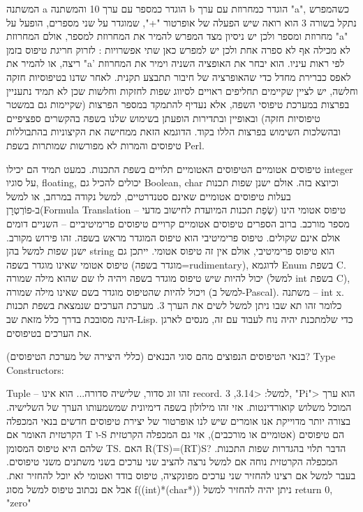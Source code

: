       המשתנה a הוגדר כמספר עם ערך 10 והמשתנה b הוגדר כמחרוזת עם ערך "a", כשהמפרש נתקל בשורה 3 הוא רואה שיש הפעלה של אופרטור "+", שמוגדר על שני מספרים, הופעל על מחרוזת ומספר ולכן יש ניסיון מצד המפרש להמיר את המחרוזת למספר, אולם המחרוזת "a" לא מכילה אף לא ספרה אחת ולכן יש למפרש כאן שתי אפשרויות : לזרוק חריגת טיפוס בזמן ריצה, או להמיר את "a' לפי ראות עיניו. הוא יבחר את האופציה השניה וימיר את המחרוזת לאפס כברירת מחדל כדי שהאופרציה של חיבור תתבצע תקנית.
      לאחר שדנו בטיפוסיות חזקה וחלשה, יש לציין שקיימים תחליפים ראויים לסיווג שפות לחזקות וחלשות שכן לא תמיד נתעניין בפרצות במערכת טיפוסי השפה, אלא נעדיף להתמקד במספר הפרצות (שקיימות גם במשטר טיפוסיות חזקה) ובאופיין ובתדירות הופעתן בשימוש שלנו בשפה בהקשרים ספציפיים ובהשלכות השימוש בפרצות הללו בקוד. הדוגמא הזאת ממחישה את הקיצוניות בהתבוללות טיפוסים והמרות לא מפורשות שמותרות בשפת Perl.

      טיפוסים אטומיים
      הטיפוסים האטומיים תלויים בשפת התכנות. כמעט תמיד הם יכילו integer על סוגיו, floating, יכולים להכיל גם Boolean, char וכיוצא בזה. אולם ישנן שפות תכנות בעלות טיפוסים אטומיים שאינם סטנדרטיים, למשל נקודה במרחב, או למשל ב-פוֹרְטְרָן(Formula Translation – שְׂפַת תכנות המיועדת לחישוב מדעי) טיפוס אטומי הינו מספר מורכב.
      ברוב הספרים טיפוסים אטומיים קרויים טיפוסים פרימיטיביים – השניים דומים אולם אינם שקולים. טיפוס פרימיטיבי הוא טיפוס המוגדר מראש בשפה. זהו פירוש מקורב. ישנן שפות למשל בהן string הוא טיפוס פרימיטיבי, אולם אין זה טיפוס אטומי. ייתכן גם טיפוס אטומי שאינו מוגדר בשפה (מוגדר בשפה=rudimentary), לדוגמא Enum בשפת C.
      יכול להיות שיש טיפוס מוגדר בשפה ויהיה לו שם שהוא מילה שמורה (למשל int בשפת C), ויכול להיות שהטיפוס מוגדר בשם שאינו מילה שמורה (למשל ב-Pascal).
      משתנה – int x. כלומר זהו תא שבו ניתן למשל לשים את הערך 3.
      מערכת הערכים שנמצאת בשפת תכנות הינה מסובכת בדרך כלל מזאת שב-Lisp. כדי שלמתכנת יהיה נוח לעבוד עם זה, מנסים לארגן את הערכים בטיפוסים.

      בנאי הטיפוסים הנפוצים
      מהם סוגי הבנאים (כללי היצירה של מערכת הטיפוסים)? Type Constructors:
      \begin{ציינון}
\item Tuple – זהו זוג סדור, שלישיה סדורה... הוא אינו record.
      למשל: <3.14, 3, "Pi"> הוא ערך המוכל משלוש קואורדינטות. אזי זהו מילולון בשפה דימיונית שמשמעותו הערך של השלישיה.
      בצורה יותר מדוייקת אנו אומרים שיש לנו אופרטור של יצירת טיפוסים חדשים בנאי המכפלה הקרטזית האומר
      אם T ו-S הם טיפוסים (אטומיים או מורכבים), אזי גם המכפלה הקרטזית שלהם היא טיפוס המסומן TS.
      האם R(TS)=(RT)S? הדבר תלוי בהגדרות שפות התכנות. המכפלה הקרטזית נוחה אם למשל נרצה להציב שני ערכים בשני משתנים משני טיפוסים. בעבר למשל אם רצינו להחזיר שני ערכים מפונקציה, טיפוס בודד ואטומי לא יוכל להחזיר זאת. אבל אם נכתוב טיפוס למשל מסוג f((int)*(char*)){}
      ניתן יהיה להחזיר למשל return 0, "zero"
  \end{ציינון}

